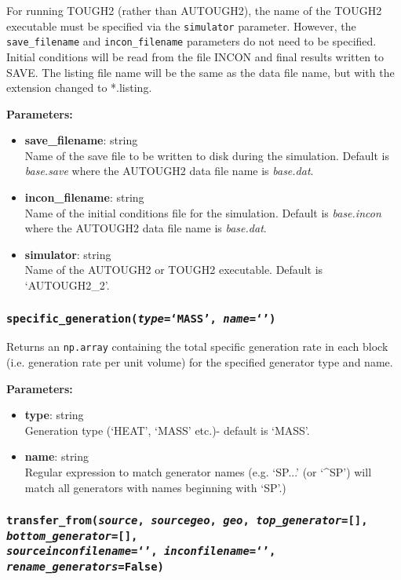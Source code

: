 For running TOUGH2 (rather than AUTOUGH2), the name of the TOUGH2 executable must be specified via the \texttt{simulator} parameter.  However, the \texttt{save\_filename} and \texttt{incon\_filename} parameters do not need to be specified.  Initial conditions will be read from the file INCON and final results written to SAVE.  The listing file name will be the same as the data file name, but with the extension changed to *.listing.

\textbf{Parameters:}
\begin{itemize}
\item \textbf{save\_filename}: string\\
  Name of the save file to be written to disk during the simulation.  Default is \emph{base.save} where the AUTOUGH2 data file name is \emph{base.dat}.
\item \textbf{incon\_filename}: string\\
  Name of the initial conditions file for the simulation.  Default is \emph{base.incon} where the AUTOUGH2 data file name is \emph{base.dat}.
\item \textbf{simulator}: string\\
  Name of the AUTOUGH2 or TOUGH2 executable.  Default is `AUTOUGH2\_2'.
\end{itemize}

\subsubsection{\texttt{specific\_generation(\emph{type}=`MASS', \emph{name}=`')}}

Returns an \texttt{np.array} containing the total specific generation rate in each block (i.e. generation rate per unit volume) for the specified generator type and name.

\textbf{Parameters:}
\begin{itemize}
\item \textbf{type}: string\\
  Generation type (`HEAT', `MASS' etc.)- default is `MASS'.
\item \textbf{name}: string\\
  Regular expression to match generator names (e.g. `SP...' (or `\^{}SP') will match all generators with names beginning with `SP'.)
\end{itemize}

\subsubsection{\texttt{transfer\_from(\emph{source}, \emph{sourcegeo}, \emph{geo}, \emph{top\_generator}=[], \emph{bottom\_generator}=[],\\
    \emph{sourceinconfilename}=`', \emph{inconfilename}=`', \emph{rename\_generators}=False)}}


